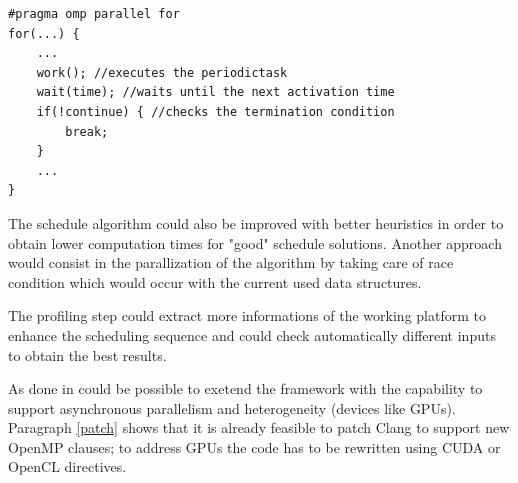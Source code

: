 \documentclass[a4paper,12pt,oneside]{book}
\begin{document}
\begin{lstlisting}[language=CCC, caption=Example of a periodic task., label=periodictask]
#pragma omp parallel for
for(...) {
	...
	work(); //executes the periodictask
	wait(time); //waits until the next activation time
	if(!continue) { //checks the termination condition
		break;
	}
	...
}

\end{lstlisting}

The schedule algorithm could also be improved with better heuristics in order to obtain lower computation times for "good" schedule solutions. Another approach would consist in the parallization of the algorithm by taking care of race condition which would occur with the current used data structures.

The profiling step could extract more informations of the working platform to enhance the scheduling sequence and could check automatically different inputs to obtain the best results.

As done in \cite{ompss} could be possible to exetend the framework with the capability to support asynchronous parallelism and heterogeneity (devices like GPUs). Paragraph \ref{patch} shows that it is already feasible to patch Clang to support new OpenMP clauses; to address GPUs the code has to be rewritten using CUDA or OpenCL directives.
\end{document}
